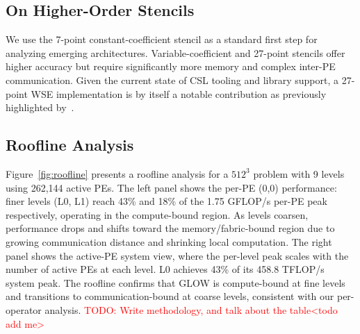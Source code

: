 \documentclass[conference]{IEEEtran}
\begin{document}
        {
            \subsection{On Higher-Order Stencils}

            We use the 7-point constant-coefficient stencil as a standard first step for analyzing emerging architectures. Variable-coefficient and 27-point stencils offer higher accuracy but require significantly more memory and complex inter-PE communication. Given the current state of CSL tooling and library support, a 27-point WSE implementation is by itself a notable contribution as previously highlighted by~\cite{mathias}.
        }
        
        
        \subsection{Roofline Analysis}
            Figure~\ref{fig:roofline} presents a roofline analysis for a $512^3$ problem with 9 levels using 262,144 active PEs. The left panel shows the per-PE (0,0) performance: finer levels (L0, L1) reach 43\% and 18\% of the 1.75 GFLOP/s per-PE peak respectively, operating in the compute-bound region. As levels coarsen, performance drops and shifts toward the memory/fabric-bound region due to growing communication distance and shrinking local computation. The right panel shows the active-PE system view, where the per-level peak scales with the number of active PEs at each level. L0 achieves 43\% of its 458.8 TFLOP/s system peak. The roofline confirms that GLOW is compute-bound at fine levels and transitions to communication-bound at coarse levels, consistent with our per-operator analysis. 
            \textcolor{red}{TODO: Write methodology, and talk about the table<todo add me>}
\end{document}
